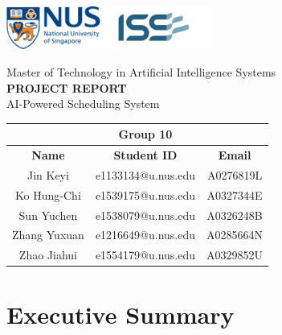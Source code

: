 \documentclass[12pt, a4paper]{article}
\begin{document}
\begin{flushright}
    \includegraphics[height=40pt]{Images/Logos/nus.png} 
    \vrule
    \includegraphics[height=40pt]{Images/Logos/iss.png}
\end{flushright}

\vspace{1.0in}

\begin{center}   
    \large Master of Technology in Artificial Intelligence Systems \\
    \Huge \MakeUppercase{\textbf{Project Report}} \\
    \Large AI-Powered Scheduling System \\

    \vspace{4.0in}
    
    \normalsize
    \begin{tabular}{c c c}
        \toprule
        & \textbf{Group 10} & \\ \midrule
        \textbf{Name} & \textbf{Student ID} & \textbf{Email} \\ \midrule
        Jin Keyi & e1133134@u.nus.edu & A0276819L \\ 
        Ko Hung-Chi & e1539175@u.nus.edu & A0327344E \\ 
        Sun Yuchen & e1538079@u.nus.edu & A0326248B \\ 
        Zhang Yuxuan & e1216649@u.nus.edu & A0285664N \\
        Zhao Jiahui & e1554179@u.nus.edu & A0329852U \\ \bottomrule
    \end{tabular}
\end{center}

\newpage

\tableofcontents

\newpage

\section{Executive Summary} 
\end{document}
